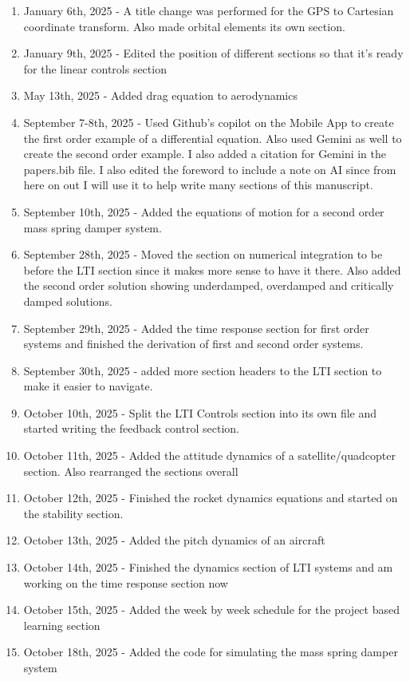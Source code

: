 \documentclass{article}
\begin{document}
\begin{enumerate}[itemsep=-5pt]
\item January 6th, 2025 - A title change was performed for the GPS to Cartesian coordinate transform. Also made orbital elements its own section.
\item January 9th, 2025 - Edited the position of different sections so that it's ready for the linear controls section
\item May 13th, 2025 - Added drag equation to aerodynamics
\item September 7-8th, 2025 - Used Github's copilot on the Mobile App to create the first order example of a differential equation. Also used Gemini as well to create the second order example. I also added a citation for Gemini in the papers.bib file. I also edited the foreword to include a note on AI since from here on out I will use it to help write many sections of this manuscript.
\item September 10th, 2025 - Added the equations of motion for a second order mass spring damper system.
\item September 28th, 2025 - Moved the section on numerical integration to be before the LTI section since it makes more sense to have it there. Also added the second order solution showing underdamped, overdamped and critically damped solutions.
\item September 29th, 2025 - Added the time response section for first order systems and finished the derivation of first and second order systems.
\item September 30th, 2025 - added more section headers to the LTI section to make it easier to navigate.
\item October 10th, 2025 - Split the LTI Controls section into its own file and started writing the feedback control section.
\item October 11th, 2025 - Added the attitude dynamics of a satellite/quadcopter section. Also rearranged the sections overall
\item October 12th, 2025 - Finished the rocket dynamics equations and started on the stability section.
\item October 13th, 2025 - Added the pitch dynamics of an aircraft
\item October 14th, 2025 - Finished the dynamics section of LTI systems and am working on the time response section now
\item October 15th, 2025 - Added the week by week schedule for the project based learning section
\item October 18th, 2025 - Added the code for simulating the mass spring damper system

\end{enumerate}
\end{document}
